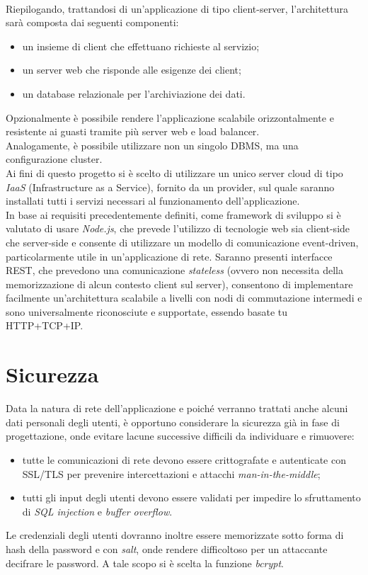 \documentclass[11pt]{report}
\begin{document}
\\
Riepilogando, trattandosi di un'applicazione di tipo client-server, l'architettura sarà composta dai seguenti componenti:
\begin{itemize}
	\item un insieme di client che effettuano richieste al servizio;
	\item un server web che risponde alle esigenze dei client;
	\item un database relazionale per l'archiviazione dei dati.
\end{itemize}
Opzionalmente è possibile rendere l'applicazione scalabile orizzontalmente e resistente ai guasti tramite più server web e load balancer.
\\Analogamente, è possibile utilizzare non un singolo DBMS, ma una configurazione cluster.
\\Ai fini di questo progetto si è scelto di utilizzare un unico server cloud di tipo \textit{IaaS} (Infrastructure as a Service), fornito da un provider, sul quale saranno installati tutti i servizi necessari al funzionamento dell'applicazione.
\\In base ai requisiti precedentemente definiti, come framework di sviluppo si è valutato di usare \textit{Node.js}, che prevede l'utilizzo di tecnologie web sia client-side che server-side e consente di utilizzare un modello di comunicazione event-driven, particolarmente utile in un'applicazione di rete.
Saranno presenti interfacce REST, che prevedono una comunicazione \textit{stateless} (ovvero non necessita della memorizzazione di alcun contesto client sul server), consentono di implementare facilmente un'architettura scalabile a livelli con nodi di commutazione intermedi e sono universalmente riconosciute e supportate, essendo basate tu HTTP+TCP+IP.

\section{Sicurezza}
Data la natura di rete dell'applicazione e poiché verranno trattati anche alcuni dati personali degli utenti, è opportuno considerare la sicurezza già in fase di progettazione, onde evitare lacune successive difficili da individuare e rimuovere:
\begin{itemize}
	\item tutte le comunicazioni di rete devono essere crittografate e autenticate con SSL/TLS per prevenire intercettazioni e attacchi \textit{man-in-the-middle};
	\item tutti gli input degli utenti devono essere validati per impedire lo sfruttamento di \textit{SQL injection} e \textit{buffer overflow}.
\end{itemize}
Le credenziali degli utenti dovranno inoltre essere memorizzate sotto forma di hash della password e con \textit{salt}, onde rendere difficoltoso per un attaccante decifrare le password.
A tale scopo si è scelta la funzione \textit{bcrypt}.
\end{document}
